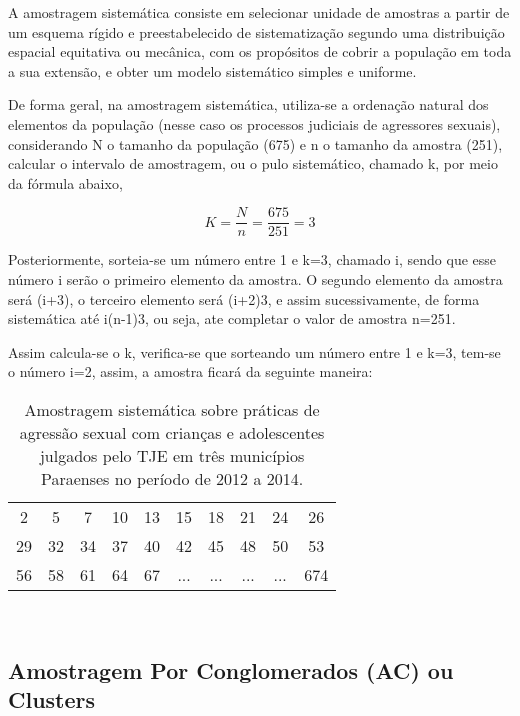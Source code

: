 
A amostragem sistemática consiste em selecionar unidade de amostras a partir
de um esquema rígido e preestabelecido de sistematização segundo uma distribuição
espacial equitativa ou mecânica, com os propósitos de cobrir a população em toda
a sua extensão, e obter um modelo sistemático simples e uniforme.
\vskip0.3cm

De forma geral, na amostragem sistemática, utiliza-se a ordenação natural dos
elementos da população (nesse caso os processos judiciais de agressores sexuais),
considerando N o tamanho da população (675) e n o tamanho da amostra (251),
calcular o intervalo de amostragem, ou o pulo sistemático, chamado k, por meio da
fórmula abaixo,

\begin{equation}
K=\frac{N}{n}=\frac{675}{251}=3
\end{equation}

Posteriormente, sorteia-se um número entre 1 e k=3, chamado i, sendo que esse
número i serão o primeiro elemento da amostra. O segundo elemento da amostra será
(i+3), o terceiro elemento será (i+2)3, e assim sucessivamente, de forma sistemática
até i(n-1)3, ou seja, ate completar o valor de amostra n=251.\vskip0.3cm

Assim calcula-se o k, verifica-se que sorteando um número entre 1 e k=3, tem-se
o número i=2, assim, a amostra ficará da seguinte maneira:



\begin{table}[!htb]
    \centering
    {
    \caption{Amostragem sistemática sobre práticas de agressão sexual com crianças e adolescentes julgados pelo TJE em três municípios Paraenses no período de 2012 a 2014.}
    \label{amostras estratificada}
    \vspace{0.1cm}
\begin{tabular}{c|c|c|c|c|c|c|c|c|c}
  \hline\hline
   2  & 5  & 7  & 10 & 13 & 15 & 18 & 21 & 24 & 26 \\
   29 & 32 & 34 & 37 & 40 & 42 & 45 & 48 & 50 & 53 \\
   56 & 58 & 61 & 64 & 67 & ... & ... & ... & ... & 674 \\
  \hline\hline
\end{tabular}}
\\
\hspace{-1.0cm}
\end{table}




\newpage
\subsection{Amostragem Por Conglomerados (AC) ou Clusters}

